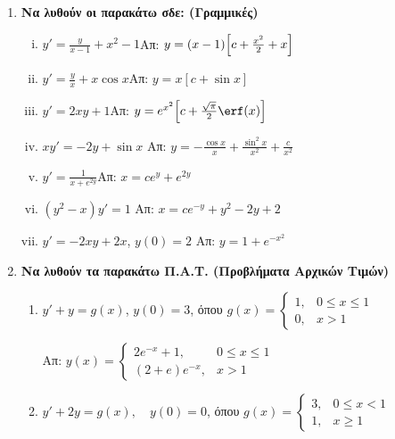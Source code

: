 


\pagestyle{askhseis}





\begin{center}
\end{center}

\vspace{\baselineskip}

\begin{enumerate}
  \item {\bfseries Να λυθούν οι παρακάτω σδε: (Γραμμικές)}
    \begin{enumerate}[i)]
      \item $y'=\frac{y}{x-1}+x^2-1$\hfill Απ: $y=(x-1)\Bigl[c+\frac{x^2}{2}+x\Bigr]$
      \item $y'=\frac{y}{x}+x\cos x$\hfill Απ: $y=x[c+\sin x]$
      \item $y'=2xy+1$\hfill Απ: $y=e^{x^2}\Bigl[c+\frac{\sqrt{\pi}}{2}\erf(x)\Bigr]$
      \item $xy'=-2y+ \sin{x}$ \hfill Απ: $ y= - \frac{\cos{x}}{x} +
        \frac{\sin^{2}{x}}{x^{2}} + \frac{c}{x^{2}} $ 
      \item $y'=\frac{1}{x+e^{2y}}$\hfill Απ: $x=ce^y+e^{2y}$
      \item $ (y^{2}-x)y'=1 $ \hfill Απ: $ x = ce^{-y}+y^{2}-2y+2 $ 
      \item $ y'=-2xy+2x $, \quad $ y(0)=2 $ \hfill Απ: $ y=1+e^{-x^{2}} $  
    \end{enumerate}

  \item {\bfseries Να λυθούν τα παρακάτω Π.Α.Τ. (Προβλήματα Αρχικών Τιμών)}
    \begin{enumerate}
      \item $y'+y=g(x)$, \quad $ y(0)=3 $, όπου 
        $g(x)=\begin{cases}1, & 0\leq x\leq 1 \\ 0, & x>1\end{cases}$ 

        \hfill Απ: $y(x)=
        \begin{cases} 
          2e^{-x}+1, & 0\leq x\leq 1 \\ 
          (2+e)e^{-x}, & x>1
        \end{cases}$

      \item $y'+2y=g(x),\quad y(0)=0$, όπου 
        $g(x)=\begin{cases}3, & 0\leq x<1 \\ 1, & x\geq 1 \end{cases}$


\end{enumerate}
\end{enumerate}
